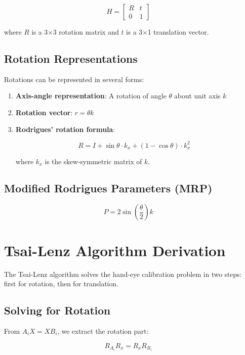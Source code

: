 \documentclass{article}
\begin{document}
\begin{equation}
H = \begin{bmatrix} R & t \\ 0 & 1 \end{bmatrix}
\end{equation}

where $R$ is a 3×3 rotation matrix and $t$ is a 3×1 translation vector.

\subsection{Rotation Representations}
Rotations can be represented in several forms:

\begin{enumerate}
\item \textbf{Axis-angle representation}: A rotation of angle $\theta$ about unit axis $k$
\item \textbf{Rotation vector}: $r = \theta k$
\item \textbf{Rodrigues' rotation formula}:

\begin{equation}
R = I + \sin\theta \cdot k_x + (1 - \cos\theta) \cdot k_x^2
\end{equation}

where $k_x$ is the skew-symmetric matrix of $k$.
\end{enumerate}

\subsection{Modified Rodrigues Parameters (MRP)}
\begin{equation}
P = 2 \sin\left(\frac{\theta}{2}\right) k
\end{equation}

\section{Tsai-Lenz Algorithm Derivation}
The Tsai-Lenz algorithm solves the hand-eye calibration problem in two steps: first for rotation, then for translation.

\subsection{Solving for Rotation}
From $A_i X = X B_i$, we extract the rotation part:

\begin{equation}
R_{A_i} R_x = R_x R_{B_i}
\end{equation}
\end{document}
